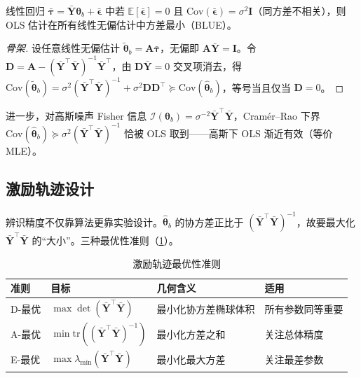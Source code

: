 \begin{theorem}
\label{thm:gauss-markov}
线性回归 $\bar{\boldsymbol\tau}=\bar{\mathbf Y}\boldsymbol\theta_b+\bar{\boldsymbol\epsilon}$ 中若 $\mathbb E[\bar{\boldsymbol\epsilon}]=0$ 且 $\mathrm{Cov}(\bar{\boldsymbol\epsilon})=\sigma^2\mathbf I$（同方差不相关），则 OLS 估计在所有线性无偏估计中方差最小（BLUE）。
\end{theorem}
\begin{proof}[骨架]
设任意线性无偏估计 $\tilde{\boldsymbol\theta}_b=\mathbf A\bar{\boldsymbol\tau}$，无偏即 $\mathbf A\bar{\mathbf Y}=\mathbf I$。令 $\mathbf D=\mathbf A-(\bar{\mathbf Y}^\top\bar{\mathbf Y})^{-1}\bar{\mathbf Y}^\top$，由 $\mathbf D\bar{\mathbf Y}=0$ 交叉项消去，得 $\mathrm{Cov}(\tilde{\boldsymbol\theta}_b)=\sigma^2(\bar{\mathbf Y}^\top\bar{\mathbf Y})^{-1}+\sigma^2\mathbf D\mathbf D^\top\succeq\mathrm{Cov}(\hat{\boldsymbol\theta}_b)$，等号当且仅当 $\mathbf D=0$。
\end{proof}

进一步，对高斯噪声 Fisher 信息 $\mathcal I(\boldsymbol\theta_b)=\sigma^{-2}\bar{\mathbf Y}^\top\bar{\mathbf Y}$，Cramér--Rao 下界 $\mathrm{Cov}(\hat{\boldsymbol\theta}_b)\succeq\sigma^2(\bar{\mathbf Y}^\top\bar{\mathbf Y})^{-1}$ 恰被 OLS 取到——高斯下 OLS 渐近有效（等价 MLE）。

\subsection{激励轨迹设计}
辨识精度不仅靠算法更靠实验设计。$\hat{\boldsymbol\theta}_b$ 的协方差正比于 $(\bar{\mathbf Y}^\top\bar{\mathbf Y})^{-1}$，故要最大化 $\bar{\mathbf Y}^\top\bar{\mathbf Y}$ 的“大小”。三种最优性准则（\cref{tab:doptimal}）。

\begin{table}[H]\centering\small
\caption{激励轨迹最优性准则}
\label{tab:doptimal}
\begin{tabular}{llll}
\toprule
准则 & 目标 & 几何含义 & 适用 \\
\midrule
D-最优 & $\max\det(\bar{\mathbf Y}^\top\bar{\mathbf Y})$ & 最小化协方差椭球体积 & 所有参数同等重要 \\
A-最优 & $\min\mathrm{tr}((\bar{\mathbf Y}^\top\bar{\mathbf Y})^{-1})$ & 最小化方差之和 & 关注总体精度 \\
E-最优 & $\max\lambda_{\min}(\bar{\mathbf Y}^\top\bar{\mathbf Y})$ & 最小化最大方差 & 关注最差参数 \\
\bottomrule
\end{tabular}
\end{table}

